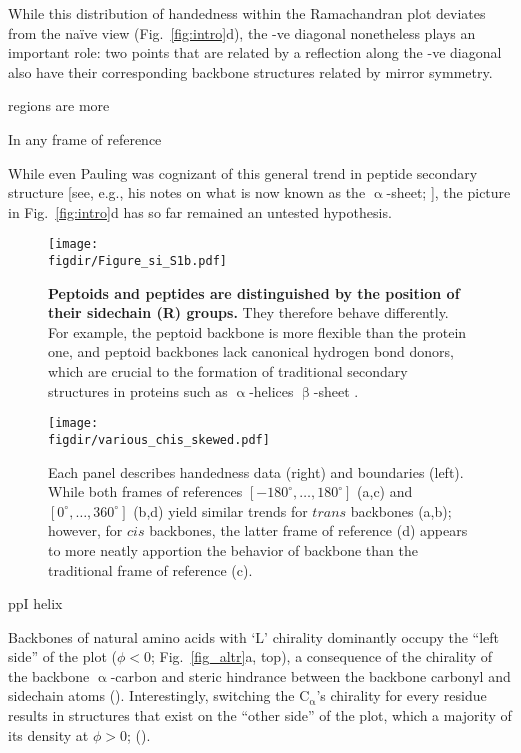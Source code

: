 \documentclass[fleqn,10pt]{wlpeerj} %
\newcommand{\Fig}[1]{Fig.~\ref{#1}}
\newcommand{\figdir}{./figures}
\begin{document}
While this distribution of handedness within the Ramachandran plot deviates from the na{\"i}ve view (\Fig{fig:intro}d), the -ve diagonal nonetheless plays an important role: two points that are related by a reflection along the -ve diagonal also have their corresponding backbone structures related by mirror symmetry. 




regions are more 

In any frame of reference



While even Pauling was cognizant of this general trend in peptide secondary structure [see, e.g., his notes on what is now known as the $\upalpha$-sheet; \cite{Pauling1951,Pauling1951a,Pauling1951b}], the picture in \Fig{fig:intro}d has so far remained an untested hypothesis.





\begin{figure}[h!]
  \centering
  \texttt{[image: \\figdir/Figure\_si\_S1b.pdf]}
  \caption{{\bf Peptoids and peptides are distinguished by the position of their sidechain (R) groups.} They therefore behave differently. For example, the peptoid backbone is more flexible than the protein one, and peptoid backbones lack canonical hydrogen bond donors, which are crucial to the formation of traditional secondary structures in proteins such as $\upalpha$-helices $\upbeta$-sheet \citep{Berg2006}.
\label{FigSIpeptoid}}
\texttt{[image: \\figdir/various\_chis\_skewed.pdf]}
\caption{\label{fig:other_chis_skewed} Each panel describes handedness data (right) and boundaries (left). While both frames of references $\left[-180^\circ,\ldots,180^\circ\right]$ (a,c) and $\left[0^\circ,\ldots,360^\circ\right]$ (b,d) yield similar trends for $trans$ backbones (a,b); however, for $cis$ backbones, the latter frame of reference (d) appears to more neatly apportion the behavior of backbone  than the traditional frame of reference (c).}
\end{figure}


\cite{Pauling1951a,Pauling1951}
\citep{MannigeKunduWhitelam2016}
ppI helix \citep{Adzhubei1993}


Backbones of natural amino acids with `L' chirality dominantly occupy the ``left side'' of the plot ($\phi<0$; \Fig{fig_altr}a, top), a consequence of the chirality of the backbone $\upalpha$-carbon \citep{Berg2006,Cintas2002} and steric hindrance between the backbone carbonyl and sidechain atoms (\cite{Branden1999}). Interestingly, switching the C$_\upalpha$'s chirality for every residue results in structures that exist on the ``other side'' of the plot, which a majority of its density at $\phi>0$; (\cite{Zawadzke1993,Hung1998}).
\end{document}
